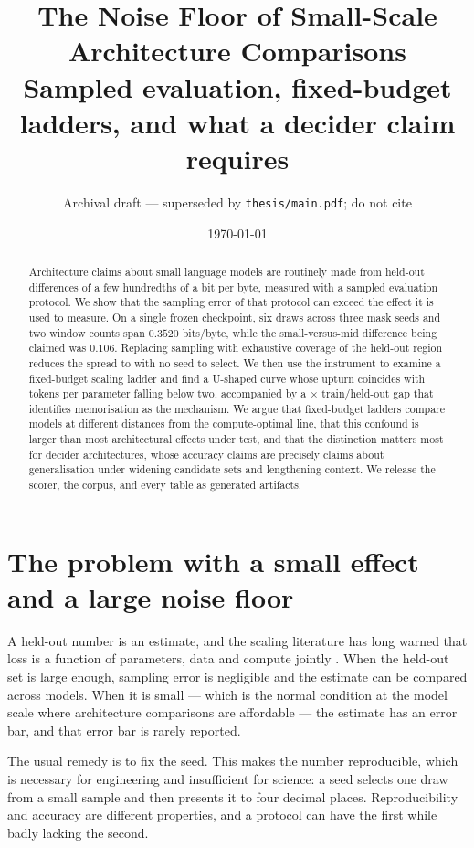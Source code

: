 \documentclass[11pt]{article}
\title{\textbf{The Noise Floor of Small-Scale Architecture Comparisons}\\[0.3em]
\large Sampled evaluation, fixed-budget ladders, and what a decider claim requires}
\author{Archival draft --- superseded by \texttt{thesis/main.pdf}; do not cite}
\date{\today}
\begin{document}
\maketitle

\begin{abstract}
Architecture claims about small language models are routinely made from held-out
differences of a few hundredths of a bit per byte, measured with a sampled
evaluation protocol. We show that the sampling error of that protocol can exceed
the effect it is used to measure. On a single frozen checkpoint, six draws across
three mask seeds and two window counts span $0.3520$ bits/byte, while the
small-versus-mid difference being claimed was $0.106$. Replacing sampling with
exhaustive coverage of the held-out region reduces the spread to \ProtoNewSpread{}
with no seed to select. We then use the instrument to examine a fixed-budget
scaling ladder and find a U-shaped curve whose upturn coincides with tokens per
parameter falling below two, accompanied by a \LargeGap$\times$ train/held-out gap
that identifies memorisation as the mechanism. We argue that fixed-budget ladders
compare models at different distances from the compute-optimal line, that this
confound is larger than most architectural effects under test, and that the
distinction matters most for decider architectures, whose accuracy claims are
precisely claims about generalisation under widening candidate sets and lengthening
context. We release the scorer, the corpus, and every table as generated artifacts.
\end{abstract}

\section{The problem with a small effect and a large noise floor}

A held-out number is an estimate, and the scaling literature has long warned that
loss is a function of parameters, data and compute jointly \citep{kaplan2020scaling,hoffmann2022chinchilla}. When the held-out set is large enough, sampling
error is negligible and the estimate can be compared across models. When it is
small --- which is the normal condition at the model scale where architecture
comparisons are affordable --- the estimate has an error bar, and that error bar is
rarely reported.

The usual remedy is to fix the seed. This makes the number reproducible, which is
necessary for engineering and insufficient for science: a seed selects one draw
from a small sample and then presents it to four decimal places. Reproducibility
and accuracy are different properties, and a protocol can have the first while
badly lacking the second.
\end{document}
